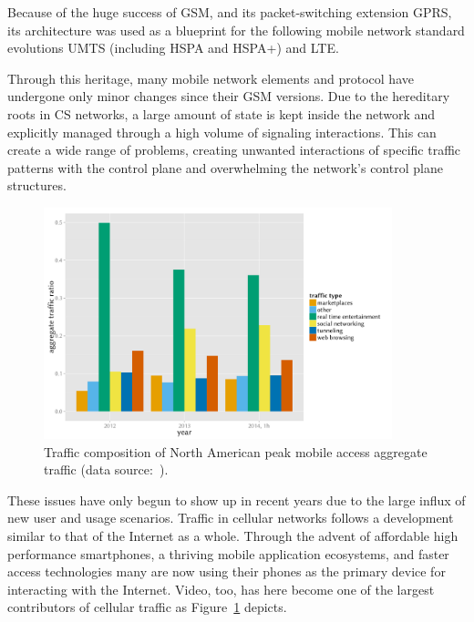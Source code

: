 Because of the huge success of \gls{GSM}, and its packet-switching extension \gls{GPRS}, its architecture was used as a blueprint for the following mobile network standard evolutions \gls{UMTS} (including \gls{HSPA} and \gls{HSPA+}) and \gls{LTE}. 

Through this heritage, many mobile network elements and protocol have undergone only minor changes since their \gls{GSM} versions. Due to the hereditary roots in \gls{CS} networks, a large amount of state is kept inside the network and explicitly managed through a high volume of signaling interactions. This can create a wide range of problems, creating unwanted interactions of specific traffic patterns with the control plane and overwhelming the network's control plane structures. 

\begin{figure}[htb]
	\centering
	\includegraphics[width=0.9\textwidth]{images/r-netvine-phenomena-mobile.pdf}
	\caption{Traffic composition of North American peak mobile access aggregate traffic (data source:~\cite{sandvine_internetphenomena}).}
\label{c1:fig:traffic-netvine-mobile}
\end{figure}

These issues have only begun to show up in recent years due to the large influx of new user and usage scenarios. Traffic in cellular networks follows a development similar to that of the Internet as a whole. Through the advent of affordable high performance smartphones, a thriving mobile application ecosystems, and faster access technologies many are now using their phones as the primary device for interacting with the Internet. Video, too, has here become one of the largest contributors of cellular traffic as Figure~\ref{c1:fig:traffic-netvine-mobile} depicts.

